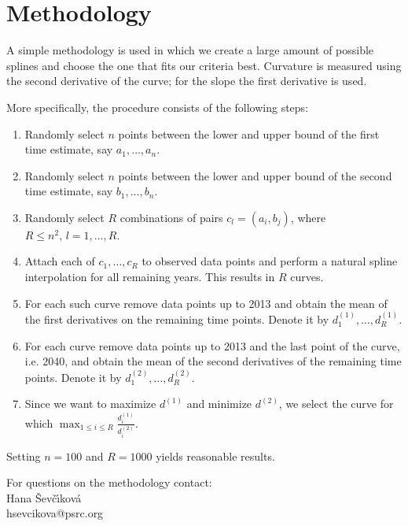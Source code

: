 \documentclass[11pt]{article}
\begin{document}
\pagebreak
%
\section{Methodology}
%
A simple methodology is used in which we create a large amount of possible splines and choose the one that fits our criteria best. Curvature is measured using the second derivative of the curve; for the slope the first derivative is used. 

More specifically, the procedure consists of the following steps:
\begin{enumerate}
\item Randomly select $n$ points between the lower and upper bound of the first time estimate, say $a_1, \dots, a_n$.
\item Randomly select $n$ points between the lower and upper bound of the second time estimate, say $b_1, \dots, b_n$.
\item Randomly select $R$ combinations of pairs $c_l=(a_i, b_j)$, where $R \leq n^2, \, l=1,\dots,R$.
\item Attach each of $c_1,\dots, c_R$ to observed data points and perform a natural spline interpolation for all remaining years. This results in $R$ curves.
\item For each such curve remove data points up to 2013 and obtain the mean of the first derivatives on the remaining time points. Denote it by $d^{(1)}_1, \dots, d^{(1)}_R$.
\item For each curve remove data points up to 2013 and the last point of the curve, i.e. 2040, and obtain the mean of the second derivatives of the remaining time points. Denote it by $d^{(2)}_1, \dots, d^{(2)}_R$.
\item Since we want to maximize $d^{(1)}$ and minimize $d^{(2)}$, we select the curve for which $\max_{1\leq i \leq R} \frac{d^{(1)}_i}{d^{(2)}_i}$.
\end{enumerate}
Setting $n=100$ and $R=1000$ yields reasonable results.


\vspace{1cm}
\begin{flushleft}
For questions on the methodology contact:\\
Hana \v{S}ev\v{c}\'{\i}kov\'{a}\\
hsevcikova@psrc.org
\end{flushleft}
\end{document}
